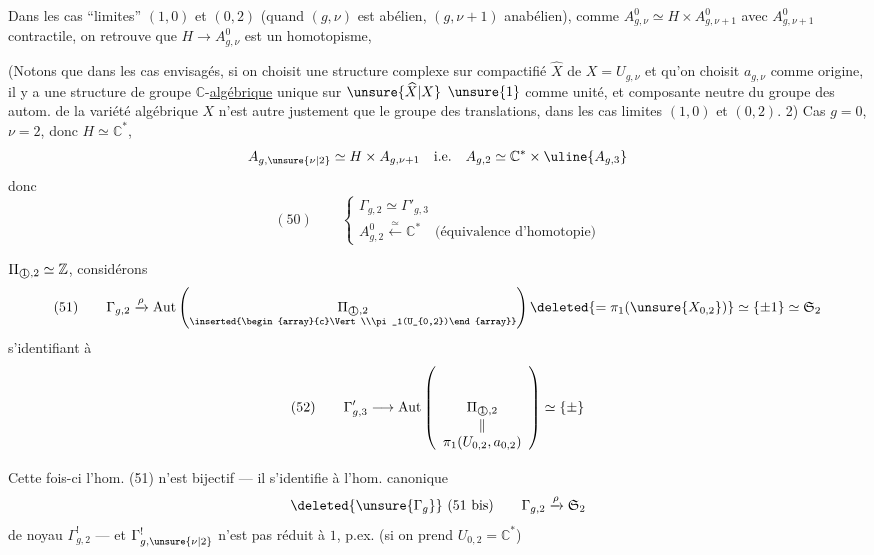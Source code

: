Dans les cas ``limites'' $(1,0)$ et $(0,2)$ (quand $(g,\nu)$ est abélien, $(g,\nu+1)$ anabélien), comme $A^0_{g,\nu}\simeq H\times A^0_{g,\nu+1}$ avec $A^0_{g,\nu+1}$ contractile, on retrouve que $H\longrightarrow A^0_{g,\nu}$ est un homotopisme, 

(Notons que dans les cas envisagés, si on choisit une structure complexe sur  compactifié  $\widehat X$ de $X=U_{g,\nu}$ et qu'on choisit $a_{g,\nu}$ comme origine, il y a une structure de groupe $\mathbb{C}$-\uline{algébrique} unique sur $\unsure{\widehat X|X}$  $\unsure{1}$ comme unité, et    composante neutre du groupe des autom. de la variété algébrique $X$ n'est autre justement que le groupe des translations, dans les cas limites $(1,0)$ et $(0,2)$.
2) Cas $g=0$, $\nu=2$, donc $H\simeq\mathbb{C}^*$,
\[
A_{g,\unsure{\nu|2}}\simeq H\times A_{g,\nu+1}\quad\text{i.e.}\quad A_{g,2}\simeq\mathbb{C}^*\times\uline{A_{g,3}}
\]
donc
\[
(50)\qquad\left\{\begin{array}{l}
\Gamma_{g,2}\simeq\Gamma'_{g,3}\\
A^0_{g,2}\xleftarrow{\simeq}\mathbb{C}^*\quad\text{(équivalence d'homotopie)}
\end{array}\right.
\]

 $\Pi_{\text{\textcircled{1}},2}\simeq\mathbb{Z}$, considérons
\[
(51)\qquad\Gamma_{g,2}\xrightarrow{\rho}\operatorname{Aut}\left(\underset{\inserted{\begin{array}{c}\Vert\\\pi_1(U_{0,2})\end{array}}}{\Pi_{\text{\textcircled{1}},2}}\right)\deleted{=\pi_1(\unsure{X_{0,2}})}\simeq\{\pm1\}\simeq\mathfrak S_2
\]
s'identifiant à
\[
(52)\qquad\Gamma'_{g,3}\longrightarrow\operatorname{Aut}\left(\underset{\begin{array}{c}\Vert\\\pi_1(U_{0,2},a_{0,2})\end{array}}{\Pi_{\text{\textcircled{1}},2}}\right)\simeq\{\pm\}
\]

Cette fois-ci l'hom. (51) n'est  bijectif --- il s'identifie à l'hom. canonique
\[
\deleted{\unsure{\Gamma_g}}\ (51\text{ bis})\qquad\Gamma_{g,2}\xrightarrow{\rho}\mathfrak S_2
\]
de noyau $\Gamma^!_{g,2}$ --- et $\Gamma^!_{g,\unsure{\nu|2}}$ n'est pas réduit à $1$, p.ex. (si on prend $U_{0,2}=\mathbb{C}^*$)

